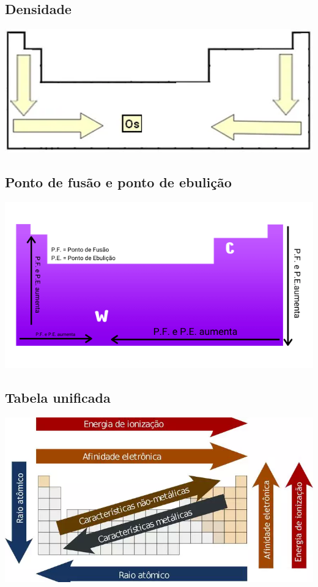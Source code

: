 \documentclass{article}
\begin{document}
\subsection{Densidade}
\begin{center}
    \includegraphics[width=1\textwidth]{tabela_periodica_densidade}
\end{center}

\subsection{Ponto de fusão e ponto de ebulição}
\begin{center}
    \includegraphics[width=1\textwidth]{tabela_periodica_p_fusao_p_ebulicao}
\end{center}

\subsection{Tabela unificada}
\begin{center}
    \includegraphics[width=1\textwidth]{tabela_periodica_unificada}
\end{center}
\end{document}
